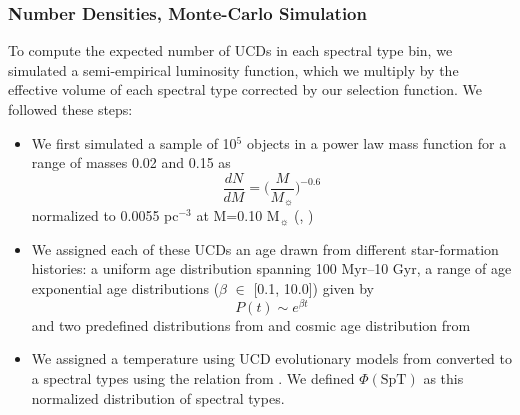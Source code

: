 \documentclass[manuscript]{aastex}
\begin{document}
\subsubsection{Number Densities, Monte-Carlo Simulation}

To compute the expected number of UCDs in each spectral type bin, we simulated a semi-empirical luminosity function, which we multiply by the effective volume of each spectral type corrected by our selection function. We followed these steps:
\begin{itemize}
\item We first simulated a sample of 10$^5$ objects in a power law mass function for a range of masses 0.02 \Msun and 0.15 \Msun  as \begin{equation}  \frac{dN}{dM} =\biggl( \frac{M}{M_\sun}\biggl)^{-0.6}\end{equation} normalized to 0.0055 pc$^{-3}$ at M=0.10 M$_\sun$ (\citealt{1999ApJ...521..613R}, \citealt{2001ApJ...554.1274C})

\item We assigned each of these UCDs an age drawn from different star-formation histories:  a uniform age distribution spanning 100 Myr--10 Gyr, a range of age exponential age distributions ($\beta$ $\in$ [0.1, 10.0])  given by \begin{equation} P(t) \sim e^{\beta  t} \end{equation}  and two predefined distributions from \cite{2009MNRAS.397.1286A} and cosmic age distribution from \cite{2010ApJ...718.1171R}

\item We assigned a temperature using UCD evolutionary models from \cite{2003IAUS..211...41B} converted to a spectral types using the relation from \cite{Filippazzo2015}. We defined $\Phi(\text{SpT})$ as this normalized distribution of spectral types.


\end{itemize}
\end{document}
